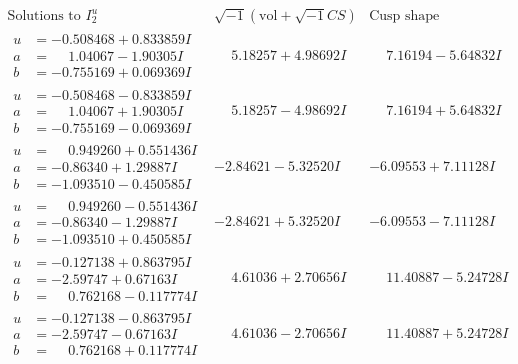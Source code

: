 \documentclass[1p]{elsarticle_modified}
\theoremstyle{definition}
\newcommand{\I}{\sqrt{-1}}
\begin{document}
$$\begin{array}{c|c|c}  
\text{Solutions to }I^u_{2}& \I (\text{vol} + \sqrt{-1}CS) & \text{Cusp shape}\\
 \hline 
\begin{aligned}
u &= -0.508468 + 0.833859 I \\
a &= \phantom{-}1.04067 - 1.90305 I \\
b &= -0.755169 + 0.069369 I\end{aligned}
 & \phantom{-}5.18257 + 4.98692 I & \phantom{-}7.16194 - 5.64832 I \\ \hline\begin{aligned}
u &= -0.508468 - 0.833859 I \\
a &= \phantom{-}1.04067 + 1.90305 I \\
b &= -0.755169 - 0.069369 I\end{aligned}
 & \phantom{-}5.18257 - 4.98692 I & \phantom{-}7.16194 + 5.64832 I \\ \hline\begin{aligned}
u &= \phantom{-}0.949260 + 0.551436 I \\
a &= -0.86340 + 1.29887 I \\
b &= -1.093510 - 0.450585 I\end{aligned}
 & -2.84621 - 5.32520 I & -6.09553 + 7.11128 I \\ \hline\begin{aligned}
u &= \phantom{-}0.949260 - 0.551436 I \\
a &= -0.86340 - 1.29887 I \\
b &= -1.093510 + 0.450585 I\end{aligned}
 & -2.84621 + 5.32520 I & -6.09553 - 7.11128 I \\ \hline\begin{aligned}
u &= -0.127138 + 0.863795 I \\
a &= -2.59747 + 0.67163 I \\
b &= \phantom{-}0.762168 - 0.117774 I\end{aligned}
 & \phantom{-}4.61036 + 2.70656 I & \phantom{-}11.40887 - 5.24728 I \\ \hline\begin{aligned}
u &= -0.127138 - 0.863795 I \\
a &= -2.59747 - 0.67163 I \\
b &= \phantom{-}0.762168 + 0.117774 I\end{aligned}
 & \phantom{-}4.61036 - 2.70656 I & \phantom{-}11.40887 + 5.24728 I \\ \hline\begin{aligned}

\end{aligned}
\end{array}$$
\end{document}
